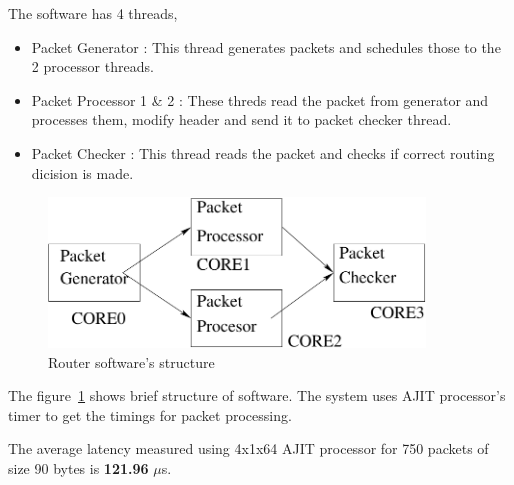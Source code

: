 \begin{appendices}
		The software has 4 threads,
		
		\begin{itemize}
			\item Packet Generator : This thread generates packets and schedules those to the 2 processor threads.
			\item Packet Processor 1 \& 2 : These threds read the packet from generator and processes them, modify header and send it to packet checker thread.
			\item Packet Checker : 	This thread reads the packet and checks if correct routing dicision is made.
		\end{itemize}
	
			
			\begin{figure}[h!]
				\centering
				\includegraphics[width=10cm]{./figures/Niral_Router.pdf}
				\caption{Router software's structure}
				\label{app:router_soft}
			\end{figure}
		
		The figure~\ref{app:router_soft} shows brief structure of software. The system uses AJIT processor's timer to get the timings for packet processing.
		
		The average latency measured using 4x1x64 AJIT processor for 750 packets of size 90 bytes is \textbf{121.96} $\mu$s.











\end{appendices}

